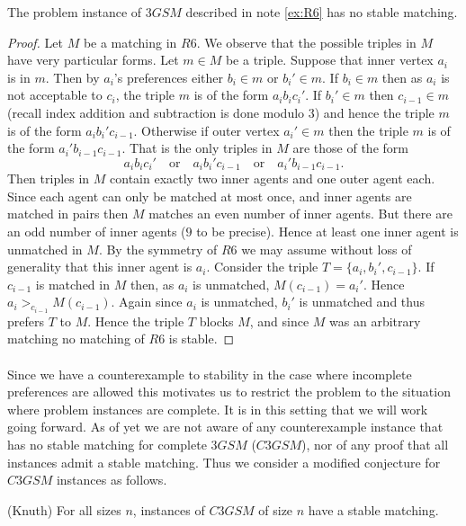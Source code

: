 \begin{lemma}
The problem instance of $3GSM$ described in note \ref{ex:R6} has no stable matching.
\end{lemma}
\begin{proof}
Let $M$ be a matching in $R6$. We observe that the possible triples in $M$ have very particular forms. Let $m \in M$ be a triple. Suppose that inner vertex $a_i$ is in $m$. Then by $a_i$'s preferences either $b_i \in m$ or $b_i' \in m$. If $b_i \in m$ then as $a_i$ is not acceptable to $c_i$, the triple $m$ is of the form $a_ib_ic_i'$. If $b_i' \in m$ then $c_{i-1} \in m$ (recall index addition and subtraction is done modulo $3$) and hence the triple $m$ is of the form $a_i b_i'c_{i-1}$. Otherwise if outer vertex $a_i' \in m$ then the triple $m$ is of the form $a_i'b_{i-1}c_{i-1}$. That is the only triples in $M$ are those of the form
$$a_ib_ic_i' \quad\text{or}\quad a_ib_i'c_{i-1} \quad\text{or}\quad a_i'b_{i-1}c_{i-1}.$$
Then triples in $M$ contain exactly two inner agents and one outer agent each. Since each agent can only be matched at most once, and inner agents are matched in pairs then $M$ matches an even number of inner agents. But there are an odd number of inner agents ($9$ to be precise). Hence at least one inner agent is unmatched in $M$. By the symmetry of $R6$ we may assume without loss of generality that this inner agent is $a_i$. Consider the triple $T=\{a_i, b_{i}', c_{i-1}\}$. If $c_{i-1}$ is matched in $M$ then, as $a_i$ is unmatched, $M(c_{i-1}) = a_i'$. Hence $a_i >_{c_{i-1}} M(c_{i-1})$. Again since $a_i$ is unmatched, $b_{i}'$ is unmatched and thus prefers $T$ to $M$. Hence the triple $T$ blocks $M$, and since $M$ was an arbitrary matching no matching of $R6$ is stable.
\end{proof}
\paragraph{}
Since we have a counterexample to stability in the case where incomplete preferences are allowed this motivates us to restrict the problem to the situation where problem instances are complete. It is in this setting that we will work going forward. As of yet we are not aware of any counterexample instance that has no stable matching for complete $3GSM$ ($C3GSM$), nor of any proof that all instances admit a stable matching. Thus we consider a modified conjecture for $C3GSM$ instances as follows.
\begin{conjecture}\label{conj:stab}
(Knuth) For all sizes $n$, instances of $C3GSM$ of size $n$ have a stable matching.
\end{conjecture} 
